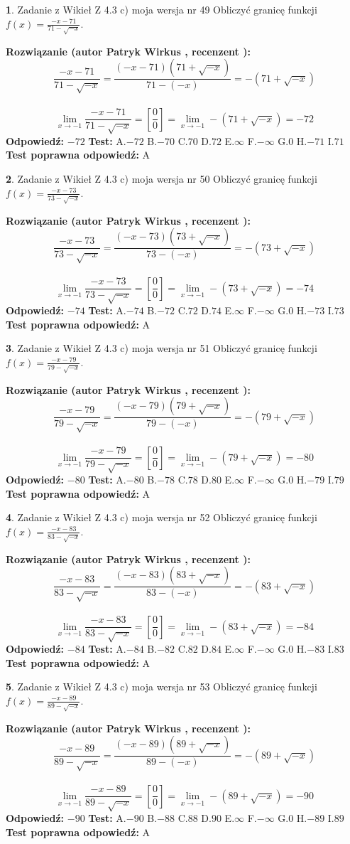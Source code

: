 \documentclass[12pt, a4paper]{article}
\theoremstyle{definition} %
\newtheorem{zad}{}
\newcommand{\zadStart}[1]{\begin{zad}#1\newline}
\newcommand{\zadStop}{\end{zad}}
\newcommand{\rozwStart}[2]{\noindent \textbf{Rozwiązanie (autor #1 , recenzent #2): }\newline}
\newcommand{\rozwStop}{\newline}
\newcommand{\odpStart}{\noindent \textbf{Odpowiedź:}\newline}
\newcommand{\odpStop}{\newline}
\newcommand{\testStart}{\noindent \textbf{Test:}\newline}
\newcommand{\testStop}{\newline}
\newcommand{\kluczStart}{\noindent \textbf{Test poprawna odpowiedź:}\newline}
\newcommand{\kluczStop}{\newline}
\begin{document}
\zadStart{Zadanie z Wikieł Z 4.3 c) moja wersja nr 49}
Obliczyć granicę funkcji $f(x)=\frac{-x-71}{71-\sqrt{-x}}$.
\zadStop
\rozwStart{Patryk Wirkus}{}
$$\frac{-x-71}{71-\sqrt{-x}}=\frac{(-x-71)(71+\sqrt{-x})}{71-(-x)}=-(71+\sqrt{-x})$$
\\
$$\lim\limits_{x\to-1}\frac{-x-71}{71-\sqrt{-x}}=[\frac{0}{0}]=\lim\limits_{x\to-1}-(71+\sqrt{-x}) =-72$$
\rozwStop
\odpStart
$-72$
\odpStop
\testStart
A.$-72$
B.$-70$
C.$70$
D.$72$
E.$\infty$
F.$-\infty$
G.$0$
H.$-71$
I.$71$
\testStop
\kluczStart
A
\kluczStop



\zadStart{Zadanie z Wikieł Z 4.3 c) moja wersja nr 50}
Obliczyć granicę funkcji $f(x)=\frac{-x-73}{73-\sqrt{-x}}$.
\zadStop
\rozwStart{Patryk Wirkus}{}
$$\frac{-x-73}{73-\sqrt{-x}}=\frac{(-x-73)(73+\sqrt{-x})}{73-(-x)}=-(73+\sqrt{-x})$$
\\
$$\lim\limits_{x\to-1}\frac{-x-73}{73-\sqrt{-x}}=[\frac{0}{0}]=\lim\limits_{x\to-1}-(73+\sqrt{-x}) =-74$$
\rozwStop
\odpStart
$-74$
\odpStop
\testStart
A.$-74$
B.$-72$
C.$72$
D.$74$
E.$\infty$
F.$-\infty$
G.$0$
H.$-73$
I.$73$
\testStop
\kluczStart
A
\kluczStop



\zadStart{Zadanie z Wikieł Z 4.3 c) moja wersja nr 51}
Obliczyć granicę funkcji $f(x)=\frac{-x-79}{79-\sqrt{-x}}$.
\zadStop
\rozwStart{Patryk Wirkus}{}
$$\frac{-x-79}{79-\sqrt{-x}}=\frac{(-x-79)(79+\sqrt{-x})}{79-(-x)}=-(79+\sqrt{-x})$$
\\
$$\lim\limits_{x\to-1}\frac{-x-79}{79-\sqrt{-x}}=[\frac{0}{0}]=\lim\limits_{x\to-1}-(79+\sqrt{-x}) =-80$$
\rozwStop
\odpStart
$-80$
\odpStop
\testStart
A.$-80$
B.$-78$
C.$78$
D.$80$
E.$\infty$
F.$-\infty$
G.$0$
H.$-79$
I.$79$
\testStop
\kluczStart
A
\kluczStop



\zadStart{Zadanie z Wikieł Z 4.3 c) moja wersja nr 52}
Obliczyć granicę funkcji $f(x)=\frac{-x-83}{83-\sqrt{-x}}$.
\zadStop
\rozwStart{Patryk Wirkus}{}
$$\frac{-x-83}{83-\sqrt{-x}}=\frac{(-x-83)(83+\sqrt{-x})}{83-(-x)}=-(83+\sqrt{-x})$$
\\
$$\lim\limits_{x\to-1}\frac{-x-83}{83-\sqrt{-x}}=[\frac{0}{0}]=\lim\limits_{x\to-1}-(83+\sqrt{-x}) =-84$$
\rozwStop
\odpStart
$-84$
\odpStop
\testStart
A.$-84$
B.$-82$
C.$82$
D.$84$
E.$\infty$
F.$-\infty$
G.$0$
H.$-83$
I.$83$
\testStop
\kluczStart
A
\kluczStop



\zadStart{Zadanie z Wikieł Z 4.3 c) moja wersja nr 53}
Obliczyć granicę funkcji $f(x)=\frac{-x-89}{89-\sqrt{-x}}$.
\zadStop
\rozwStart{Patryk Wirkus}{}
$$\frac{-x-89}{89-\sqrt{-x}}=\frac{(-x-89)(89+\sqrt{-x})}{89-(-x)}=-(89+\sqrt{-x})$$
\\
$$\lim\limits_{x\to-1}\frac{-x-89}{89-\sqrt{-x}}=[\frac{0}{0}]=\lim\limits_{x\to-1}-(89+\sqrt{-x}) =-90$$
\rozwStop
\odpStart
$-90$
\odpStop
\testStart
A.$-90$
B.$-88$
C.$88$
D.$90$
E.$\infty$
F.$-\infty$
G.$0$
H.$-89$
I.$89$
\testStop
\kluczStart
A
\kluczStop
\end{document}
